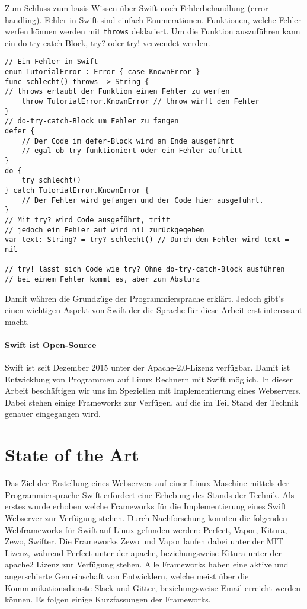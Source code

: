 Zum Schluss zum basis Wissen über Swift noch Fehlerbehandlung (error handling). Fehler in Swift sind einfach Enumerationen. Funktionen, welche Fehler werfen können werden mit \lstinline{throws} deklariert. Um die Funktion auszuführen kann ein do-try-catch-Block, try? oder try! verwendet werden.
\begin{lstlisting}
// Ein Fehler in Swift
enum TutorialError : Error { case KnownError }
func schlecht() throws -> String { 
// throws erlaubt der Funktion einen Fehler zu werfen
    throw TutorialError.KnownError // throw wirft den Fehler
}
// do-try-catch-Block um Fehler zu fangen
defer {
    // Der Code im defer-Block wird am Ende ausgeführt
    // egal ob try funktioniert oder ein Fehler auftritt
}
do {
    try schlecht()
} catch TutorialError.KnownError {
    // Der Fehler wird gefangen und der Code hier ausgeführt.
}
// Mit try? wird Code ausgeführt, tritt
// jedoch ein Fehler auf wird nil zurückgegeben
var text: String? = try? schlecht() // Durch den Fehler wird text = nil

// try! lässt sich Code wie try? Ohne do-try-catch-Block ausführen
// bei einem Fehler kommt es, aber zum Absturz 
\end{lstlisting}
Damit währen die Grundzüge der Programmiersprache erklärt. Jedoch gibt’s einen wichtigen Aspekt von Swift der die Sprache für diese Arbeit erst interessant  macht.
\paragraph{Swift ist Open-Source}
\label{para:swiftistopensource}
Swift ist seit Dezember 2015 unter der Apache-2.0-Lizenz verfügbar\parencite{swiftorg}. Damit ist Entwicklung von Programmen auf Linux Rechnern mit Swift möglich. In dieser Arbeit beschäftigen wir uns im Speziellen mit Implementierung eines Webservers.  Dabei stehen einige Frameworks zur Verfügen, auf die im Teil Stand der Technik genauer eingegangen wird.
\section{State of the Art}
\label{sec:stateoftheart}
Das Ziel der Erstellung eines Webservers auf einer Linux-Maschine mittels der Programmiersprache Swift erfordert eine Erhebung des Stands der Technik. Als erstes wurde erhoben welche Frameworks für die Implementierung eines Swift Webserver zur Verfügung stehen. Durch Nachforschung konnten die folgenden Webframeworks für Swift auf Linux gefunden werden:  Perfect\parencite{perfect}, Vapor\parencite{vapor}, Kitura\parencite{kitura}, Zewo\parencite{zewo}, Swifter\parencite{swifter}. Die Frameworks Zewo und Vapor laufen dabei unter der MIT Lizenz, während Perfect unter der apache, beziehungsweise Kitura unter der apache2 Lizenz zur Verfügung stehen. Alle Frameworks haben eine aktive und angerschierte Gemeinschaft von Entwicklern, welche meist über die Kommunikationsdienste Slack und Gitter, beziehungsweise Email erreicht werden können. Es folgen einige Kurzfassungen der Frameworks. 
